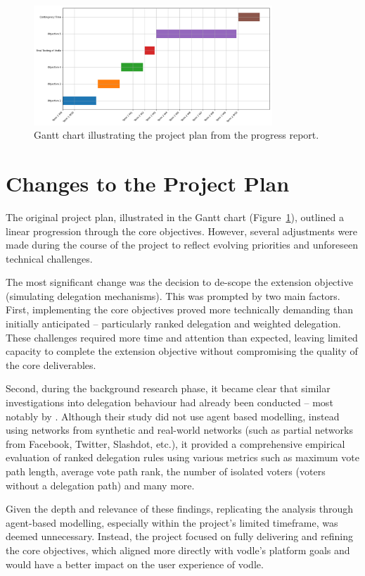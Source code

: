 \begin{figure}[H]
    \centering
    \includegraphics[width=0.8\textwidth]{../common/initial_gantt.png}
    \caption{Gantt chart illustrating the project plan from the progress report.}
    \label{fig:gantt}
\end{figure}


\section{Changes to the Project Plan}
The original project plan, illustrated in the Gantt chart (Figure~\ref{fig:gantt}), outlined a linear progression through the core objectives. However, several adjustments were made during the course of the project to reflect evolving priorities and unforeseen technical challenges.

The most significant change was the decision to de-scope the extension objective (simulating delegation mechanisms). This was prompted by two main factors. First, implementing the core objectives proved more technically demanding than initially anticipated -- particularly ranked delegation and weighted delegation. These challenges required more time and attention than expected, leaving limited capacity to complete the extension objective without compromising the quality of the core deliverables.

Second, during the background research phase, it became clear that similar investigations into delegation behaviour had already been conducted -- most notably by \citet{brill_liquid_2021}. Although their study did not use agent based modelling, instead using networks from synthetic and real-world networks (such as partial networks from Facebook, Twitter, Slashdot, etc.), it provided a comprehensive empirical evaluation of ranked delegation rules using various metrics such as maximum vote path length, average vote path rank, the number of isolated voters (voters without a delegation path) and many more.

Given the depth and relevance of these findings, replicating the analysis through agent-based modelling, especially within the project's limited timeframe, was deemed unnecessary. Instead, the project focused on fully delivering and refining the core objectives, which aligned more directly with vodle's platform goals and would have a better impact on the user experience of vodle.

